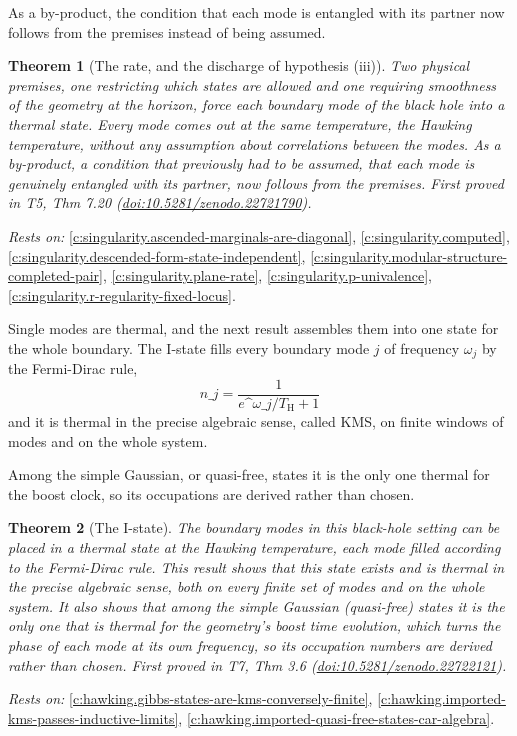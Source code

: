 \documentclass[11pt]{article}
\newtheorem{theorem}{Theorem}[section]
\theoremstyle{definition}
\theoremstyle{plain}
\providecommand{\TH}{}\renewcommand{\TH}{T_{\mathrm{H}}}
\begin{document}
As a by-product, the condition that each mode is entangled with its partner now follows from the premises instead of being assumed.

\begin{theorem}[The rate, and the discharge of hypothesis (iii)]\label{c:singularity.rate-discharge-hypothesis-iii}
Two physical premises, one restricting which states are allowed and one requiring smoothness of the geometry at the horizon, force each boundary mode of the black hole into a thermal state. Every mode comes out at the same temperature, the Hawking temperature, without any assumption about correlations between the modes. As a by-product, a condition that previously had to be assumed, that each mode is genuinely entangled with its partner, now follows from the premises.
\emph{First proved in} T5, Thm 7.20 (\href{https://doi.org/10.5281/zenodo.22721790}{doi:10.5281/zenodo.22721790}).
\end{theorem}
\noindent\emph{Rests on:} \ref{c:singularity.ascended-marginals-are-diagonal}, \ref{c:singularity.computed}, \ref{c:singularity.descended-form-state-independent}, \ref{c:singularity.modular-structure-completed-pair}, \ref{c:singularity.plane-rate}, \ref{c:singularity.p-univalence}, \ref{c:singularity.r-regularity-fixed-locus}.

Single modes are thermal, and the next result assembles them into one state for the whole boundary. The I-state fills every boundary mode $j$ of frequency $\omega_j$ by the Fermi-Dirac rule, \[ n\_j = \frac{1}{e\^{}{\omega\_j/\TH} + 1} \] and it is thermal in the precise algebraic sense, called KMS, on finite windows of modes and on the whole system.

Among the simple Gaussian, or quasi-free, states it is the only one thermal for the boost clock, so its occupations are derived rather than chosen.

\begin{theorem}[The I-state]\label{c:hawking.i-state}
The boundary modes in this black-hole setting can be placed in a thermal state at the Hawking temperature, each mode filled according to the Fermi-Dirac rule. This result shows that this state exists and is thermal in the precise algebraic sense, both on every finite set of modes and on the whole system. It also shows that among the simple Gaussian (quasi-free) states it is the only one that is thermal for the geometry's boost time evolution, which turns the phase of each mode at its own frequency, so its occupation numbers are derived rather than chosen.
\emph{First proved in} T7, Thm 3.6 (\href{https://doi.org/10.5281/zenodo.22722121}{doi:10.5281/zenodo.22722121}).
\end{theorem}
\noindent\emph{Rests on:} \ref{c:hawking.gibbs-states-are-kms-conversely-finite}, \ref{c:hawking.imported-kms-passes-inductive-limits}, \ref{c:hawking.imported-quasi-free-states-car-algebra}.
\end{document}
